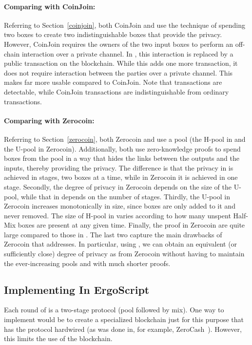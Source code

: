 \documentclass[runningheads]{llncs}
\newcommand{\langname}{ErgoScript\xspace}
\begin{document}
\paragraph{Comparing with CoinJoin:} Referring to Section~\ref{coinjoin}, both CoinJoin and \algname use the technique of spending two boxes to create two indistinguishable boxes that provide the privacy. However, CoinJoin requires the owners of the two input boxes to perform an off-chain interaction over a private channel. In \algname, this interaction is replaced by a public transaction on the blockchain. While this adds one more transaction, it does not require interaction between the parties over a private channel. This makes \algname far more usable compared to CoinJoin. Note that \algname transactions are detectable, while CoinJoin transactions are indistinguishable from ordinary transactions.

\paragraph{Comparing with Zerocoin:} Referring to Section~\ref{zerocoin}, both Zerocoin and \algname use a pool (the H-pool in \algname and the U-pool in Zerocoin). Additionally, both use zero-knowledge proofs to spend boxes from the pool in a way that hides the links between the outputs and the inputs, thereby providing the privacy. 
The difference is that the privacy in \algname is achieved in stages, two boxes at a time, while in Zerocoin it is achieved in one stage. Secondly, the degree of privacy in Zerocoin depends on the size of the U-pool, while that in \algname depends on the number of stages. Thirdly, the U-pool in Zerocoin increases monotonically in size, since boxes are only added to it and never removed. The size of H-pool in \algname varies according to how many unspent Half-Mix boxes are present at any given time. Finally, the proof in Zerocoin are quite large compared to those in \algname. The last two capture the main drawbacks of Zerocoin that \algname addresses.
In particular, using \algname, we can obtain an equivalent (or sufficiently close) degree of privacy as from Zerocoin without having to maintain the ever-increasing pools and with much shorter proofs. 

\subsection{Implementing \algname In \langname}
\label{impl}
Each round of \algname is a two-stage protocol (pool followed by mix). One way to implement \algname would be to create a specialized blockchain just for this purpose that has the protocol hardwired (as was done in, for example, ZeroCash~\cite{zcash}). However, this limits the use of the blockchain. 
\end{document}
